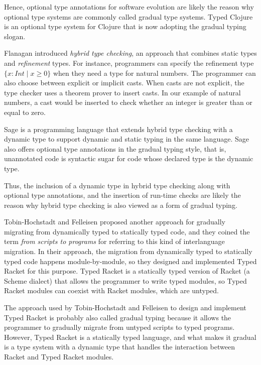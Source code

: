 Hence, optional type annotations for software evolution are likely
the reason why optional type systems are commonly called
gradual type systems.
Typed Clojure \cite{bonnaire-sergeant2012typed-clojure} is an
optional type system for Clojure that is now adopting the
gradual typing slogan.

Flanagan \cite{flanagan2006htc} introduced \emph{hybrid type checking},
an approach that combines static types and \emph{refinement} types.
For instance, programmers can specify the refinement type
$\{x:Int \;|\; x \ge 0\}$ when they need a type for natural numbers.
The programmer can also choose between explicit or implicit casts.
When casts are not explicit, the type checker uses a theorem prover
to insert casts.
In our example of natural numbers, a cast would be inserted to check
whether an integer is greater than or equal to zero.

Sage \cite{gronski2006sage} is a programming language that
extends hybrid type checking with a dynamic type to
support dynamic and static typing in the same language.
Sage also offers optional type annotations in the gradual typing
style, that is, unannotated code is syntactic sugar for
code whose declared type is the dynamic type.

Thus, the inclusion of a dynamic type in hybrid type checking
along with optional type annotations, and the insertion of run-time
checks are likely the reason why hybrid type checking is
also viewed as a form of gradual typing.

Tobin-Hochstadt and Felleisen \cite{tobin-hochstadt2006ims} proposed
another approach for gradually migrating from dynamically typed to
statically typed code, and they coined the term
\emph{from scripts to programs} for referring to this kind of
interlanguage migration.
In their approach, the migration from dynamically typed to
statically typed code happens module-by-module, so they designed
and implemented Typed Racket \cite{tobin-hochstadt2008ts} for
this purpose.
Typed Racket is a statically typed version of Racket
(a Scheme dialect) that allows the programmer to write typed modules,
so Typed Racket modules can coexist with Racket modules,
which are untyped.

The approach used by Tobin-Hochstadt and Felleisen \cite{tobin-hochstadt2008ts}
to design and implement Typed Racket is probably also called gradual typing
because it allows the programmer to gradually migrate from untyped
scripts to typed programs.
However, Typed Racket is a statically typed language,
and what makes it gradual is a type system with a dynamic type
that handles the interaction between Racket and Typed Racket modules.

